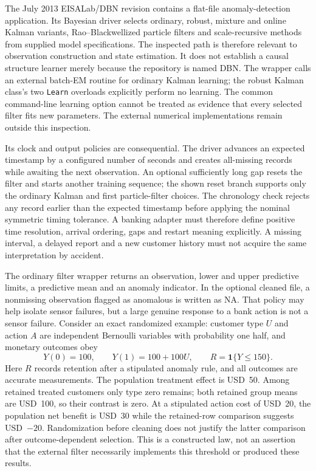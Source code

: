 The July 2013 EISALab/DBN revision contains a flat-file anomaly-detection
application. Its Bayesian driver selects ordinary, robust, mixture and online
Kalman variants, Rao--Blackwellized particle filters and scale-recursive
methods from supplied model specifications. The inspected path is therefore
relevant to observation construction and state estimation. It does not
establish a causal structure learner merely because the repository is named
DBN. The wrapper calls an external batch-EM routine for ordinary Kalman
learning; the robust Kalman class's two \texttt{Learn} overloads explicitly
perform no learning. The common command-line learning option cannot be treated
as evidence that every selected filter fits new parameters. The external
numerical implementations remain outside this inspection. \citep{rel19eisadbn}

Its clock and output policies are consequential. The driver advances an
expected timestamp by a configured number of seconds and creates all-missing
records while awaiting the next observation. An optional sufficiently long
gap resets the filter and starts another training sequence; the shown reset
branch supports only the ordinary Kalman and first particle-filter choices.
The chronology check rejects any record earlier than the expected timestamp
before applying the nominal symmetric timing tolerance. A banking adapter must
therefore define positive time resolution, arrival ordering, gaps and restart
meaning explicitly. A missing interval, a delayed report and a new customer
history must not acquire the same interpretation by accident. \citep{rel19eisadbn}

The ordinary filter wrapper returns an observation, lower and upper predictive
limits, a predictive mean and an anomaly indicator. In the optional cleaned
file, a nonmissing observation flagged as anomalous is written as NA. That
policy may help isolate sensor failures, but a large genuine response to a
bank action is not a sensor failure. Consider an exact randomized example:
customer type $U$ and action $A$ are independent Bernoulli variables with
probability one half, and monetary outcomes obey
\begin{equation}
 Y(0)=100,\qquad Y(1)=100+100U,\qquad
 R=\mathbf 1\{Y\leq150\}.
 \label{rel19:cleaning}
\end{equation}
Here $R$ records retention after a stipulated anomaly rule, and all outcomes
are accurate measurements. The population treatment effect is USD~50.
Among retained treated customers only type zero remains; both retained group
means are USD~100, so their contrast is zero. At a stipulated action cost of
USD~20, the population net benefit is USD~30 while the retained-row comparison
suggests USD~$-20$. Randomization before cleaning does not justify the latter
comparison after outcome-dependent selection. This is a constructed law,
not an assertion that the external filter necessarily implements this threshold
or produced these results. \citep{rel19dbnwitness}

